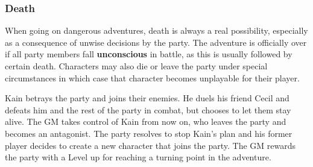 \vfill

\subsubsection*{Death}
When going on dangerous adventures, death is always a real possibility, especially as a consequence of unwise decisions by the party. 
The adventure is officially over if all party members fall \textbf{unconscious} in battle, as this is usually followed by certain death. 
Characters may also die or leave the party under special circumstances in which case that character becomes unplayable for their player. 

\vspace*{0.7cm}

{
	Kain betrays the party and joins their enemies. 
	He duels his friend Cecil and defeats him and the rest of the party in combat, but chooses to let them stay alive.
	The GM takes control of Kain from now on, who leaves the party and becomes an antagonist.
	The party resolves to stop Kain's plan and his former player decides to create a new character that joins the party. 
	The GM rewards the party with a Level up for reaching a turning point in the adventure.
}

\pagebreak
